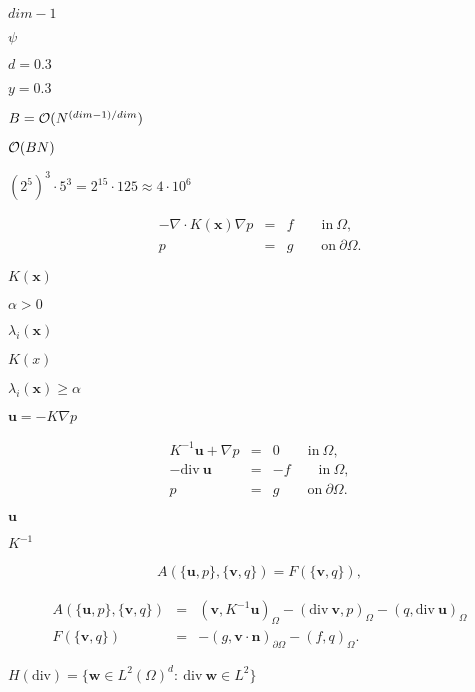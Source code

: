 \documentclass{article}
\begin{document}
$dim-1$
\pagebreak

$\psi$
\pagebreak

$d=0.3$
\pagebreak

$y=0.3$
\pagebreak

$B={\cal O}(N^{(dim-1)/dim})$
\pagebreak

${\cal O}(BN)$
\pagebreak

$(2^5)^3 \cdot 5^3=2^{15}\cdot 125 \approx 4\cdot 10^6$
\pagebreak

\begin{eqnarray*} -\nabla \cdot K({\mathbf x}) \nabla p &=& f \qquad {\textrm{in}\ } \Omega, \\ p &=& g \qquad {\textrm{on}\ }\partial\Omega. \end{eqnarray*}
\pagebreak

$K({\mathbf x})$
\pagebreak

$\alpha>0$
\pagebreak

$\lambda_i({\mathbf x})$
\pagebreak

$K(x)$
\pagebreak

$\lambda_i({\mathbf x})\ge \alpha$
\pagebreak

${\mathbf u}=-K\nabla p$
\pagebreak

\begin{eqnarray*} K^{-1} {\mathbf u} + \nabla p &=& 0 \qquad {\textrm{in}\ } \Omega, \\ -{\textrm{div}}\ {\mathbf u} &=& -f \qquad {\textrm{in}\ }\Omega, \\ p &=& g \qquad {\textrm{on}\ } \partial\Omega. \end{eqnarray*}
\pagebreak

${\mathbf u}$
\pagebreak

$K^{-1}$
\pagebreak

\begin{eqnarray*} A(\{{\mathbf u},p\},\{{\mathbf v},q\}) = F(\{{\mathbf v},q\}), \end{eqnarray*}
\pagebreak

\begin{eqnarray*} A(\{{\mathbf u},p\},\{{\mathbf v},q\}) &=& ({\mathbf v}, K^{-1}{\mathbf u})_\Omega - ({\textrm{div}}\ {\mathbf v}, p)_\Omega - (q,{\textrm{div}}\ {\mathbf u})_\Omega \\ F(\{{\mathbf v},q\}) &=& -(g,{\mathbf v}\cdot {\mathbf n})_{\partial\Omega} - (f,q)_\Omega. \end{eqnarray*}
\pagebreak

$H({\textrm{div}})=\{{\mathbf w}\in L^2(\Omega)^d:\ {\textrm{div}}\ {\mathbf w}\in L^2\}$
\pagebreak
\end{document}
